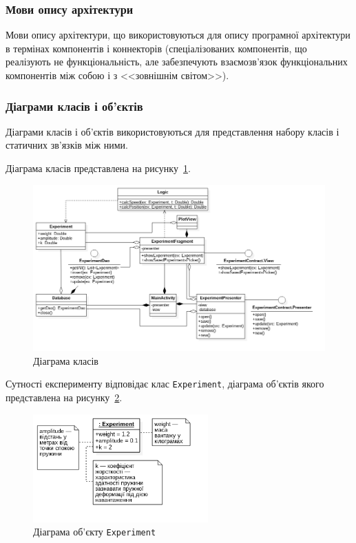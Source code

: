 \subsubsection{Мови опису архітектури}
Мови опису архітектури, що використовуються для опису програмної архітектури в термінах компонентів і коннекторів (спеціалізованих компонентів, що реалізують не функціональність, але забезпечують взаємозв'язок функціональних компонентів між собою і з <<зовнішнім світом>>).

\subsubsection{Діаграми класів і об’єктів}
Діаграми класів і об’єктів використовуються для представлення набору класів і статичних зв'язків між ними.

Діаграма класів представлена на рисунку~\ref{fig:uml_class}.

\begin{figure}[H]
  \centering
    \includegraphics[width=1\textwidth]{uml_class}
  \caption{Діаграма класів}
  \label{fig:uml_class}
\end{figure}

Сутності експерименту відповідає клас \texttt{Experiment}, діаграма об'єктів якого представлена на рисунку~\ref{fig:uml_object_experiment}.

\begin{figure}[H]
  \centering
    \includegraphics[width=0.6\textwidth]{uml_object_experiment}
  \caption{Діаграма об'єкту \texttt{Experiment}}
  \label{fig:uml_object_experiment}
\end{figure}

